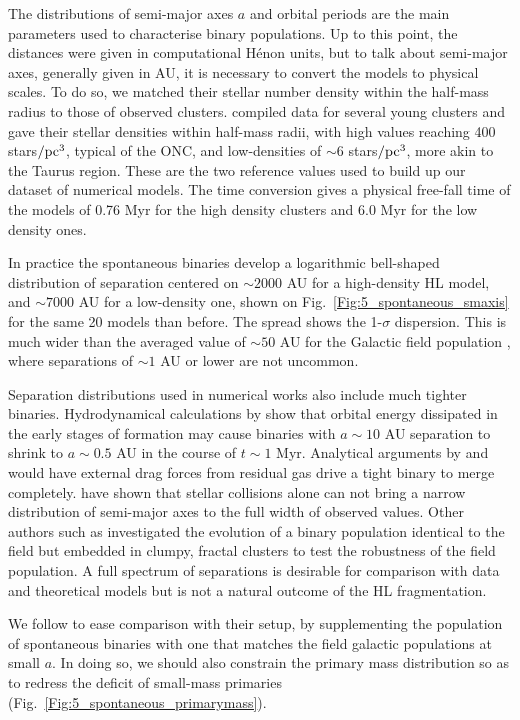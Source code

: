 The distributions of semi-major axes $a$ and orbital  periods are the main parameters used to 
characterise binary populations. Up to this point, the distances were given in  computational H\'enon units, but to talk about semi-major axes, generally given in AU, it is necessary to convert the models to physical scales. To do so, we matched their stellar number density within the half-mass radius to those of observed clusters.  \cite{King2012a}  compiled  data for several young clusters and gave their stellar densities within half-mass radii, with high values reaching  400 stars$/{\textrm{pc}}^3$, typical of the ONC, and low-densities  of $\sim 6$ stars$/{\textrm{pc}}^3$, more akin to the Taurus region. These are the two reference values used to build up our dataset of numerical models. The time conversion gives a physical free-fall time of the models of 0.76 Myr for the high density clusters and 6.0 Myr for the low density ones.



In practice the spontaneous binaries develop a logarithmic bell-shaped  distribution of separation centered on $\sim 2000$ AU for a high-density HL model,  and $\sim 7000$ AU for a low-density one, shown on Fig.~\ref{Fig:5_spontaneous_smaxis} for the same 20 models than before. The spread shows the 1-$\sigma$ dispersion. This is much wider than the averaged value of $\sim 50$ AU for the Galactic field population \citep{DM91,Raghavan2010}, where separations of $\sim 1 $ AU or lower are not uncommon.

Separation distributions used in numerical works also include much tighter binaries. Hydrodynamical calculations by \cite{Bate2012} show that orbital energy dissipated in the early stages of formation may cause binaries with $ a \sim 10 $ AU  separation to shrink to $ a \sim  0.5 $ AU in the course of $t \sim 1 $ Myr. Analytical arguments by \cite{Stahler2010} and \cite{Korntreff2012} would have external drag forces from residual gas drive a tight binary to merge completely. \cite{Kroupa2001} have shown that stellar collisions  alone can not bring a narrow distribution of semi-major axes to the full width of observed values. Other authors such as \cite{Parker2014} investigated the evolution of a binary population identical to the field but embedded in clumpy, fractal clusters \citep{Goodwin2004} to test the robustness of the field population. 
A full spectrum of separations is desirable for comparison with data and theoretical models but is not a  natural outcome of the HL fragmentation. 

We follow \cite{Parker2014} to ease comparison with their setup, by supplementing the population of spontaneous binaries with one that matches the field galactic populations at small $a$. 
In doing so, we should also constrain the primary mass distribution so as to redress the deficit of small-mass primaries (Fig.~\ref{Fig:5_spontaneous_primarymass}).



